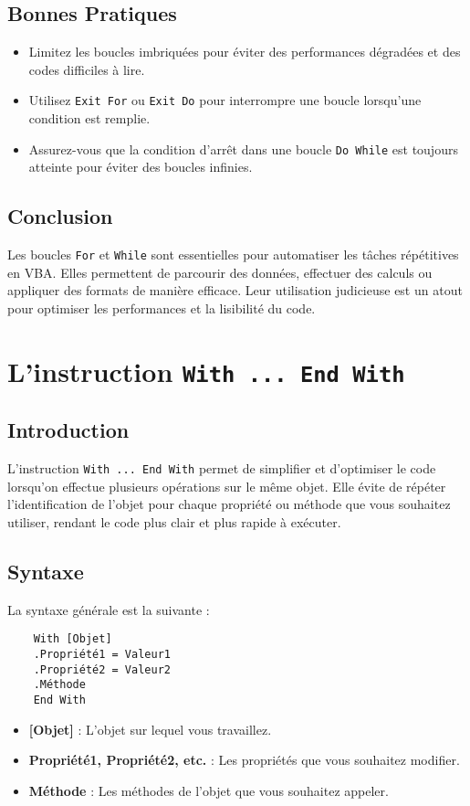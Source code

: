 \documentclass[a4paper,12pt]{report}
\begin{document}
\section{Bonnes Pratiques}
\begin{itemize}
	\item Limitez les boucles imbriquées pour éviter des performances dégradées et des codes difficiles à lire.
	\item Utilisez \texttt{Exit For} ou \texttt{Exit Do} pour interrompre une boucle lorsqu'une condition est remplie.
	\item Assurez-vous que la condition d'arrêt dans une boucle \texttt{Do While} est toujours atteinte pour éviter des boucles infinies.
\end{itemize}

\section{Conclusion}
Les boucles \texttt{For} et \texttt{While} sont essentielles pour automatiser les tâches répétitives en VBA. Elles permettent de parcourir des données, effectuer des calculs ou appliquer des formats de manière efficace. Leur utilisation judicieuse est un atout pour optimiser les performances et la lisibilité du code.



\chapter{L'instruction \texttt{With ... End With}}

\section{Introduction}
L'instruction \texttt{With ... End With} permet de simplifier et d'optimiser le code lorsqu'on effectue plusieurs opérations sur le même objet. Elle évite de répéter l'identification de l'objet pour chaque propriété ou méthode que vous souhaitez utiliser, rendant le code plus clair et plus rapide à exécuter.

\section{Syntaxe}
La syntaxe générale est la suivante :
\begin{lstlisting}
	With [Objet]
	.Propriété1 = Valeur1
	.Propriété2 = Valeur2
	.Méthode
	End With
\end{lstlisting}
\begin{itemize}
	\item \textbf{[Objet]} : L'objet sur lequel vous travaillez.
	\item \textbf{Propriété1, Propriété2, etc.} : Les propriétés que vous souhaitez modifier.
	\item \textbf{Méthode} : Les méthodes de l'objet que vous souhaitez appeler.
\end{itemize}
\newpage
\end{document}
